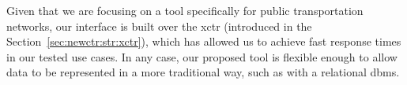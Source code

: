     
    
    
    
    
    
    
    Given that we are focusing on a tool specifically for public transportation networks, our interface is built over the \gls{xctr} (introduced in the Section~\ref{sec:newctr:str:xctr}), which has allowed us to achieve fast response times in our tested use cases. In any case, our proposed tool is flexible enough to allow data to be represented in a more traditional way, such as with a relational \gls{dbms}.
	
